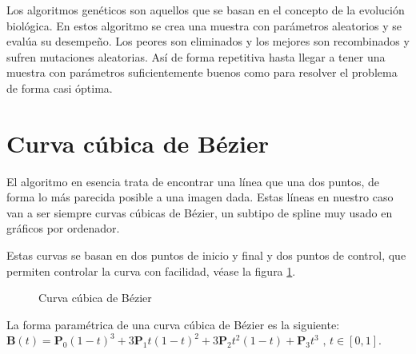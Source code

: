\documentclass{report}
\begin{document}
Los algoritmos genéticos son aquellos que se basan en el concepto de la evolución biológica.
En estos algoritmo se crea una muestra con parámetros aleatorios y se evalúa su desempeño.
Los peores son eliminados y los mejores son recombinados y sufren mutaciones aleatorias. Así de forma repetitiva hasta
llegar a tener una muestra con parámetros suficientemente buenos como para resolver el problema de 
forma casi óptima.

\section{Curva cúbica de Bézier}

El algoritmo en esencia trata de encontrar una línea que una dos puntos, de forma lo más parecida
posible a una imagen dada. Estas líneas en nuestro caso van a ser siempre curvas cúbicas de Bézier,
un subtipo de spline muy usado en gráficos por ordenador.\cite{wiki:bezier}

Estas curvas se basan en dos puntos de inicio y final y dos puntos de control, que permiten controlar
la curva con facilidad, véase la figura \ref{fig:bezier}.

\begin{figure}
	\caption{\label{fig:bezier} Curva cúbica de Bézier}
\end{figure}

La forma paramétrica de una curva cúbica de Bézier es la siguiente:  \\

\begin{math}
	\mathbf{B}(t)=\mathbf{P}_0(1-t)^3+3\mathbf{P}_1t(1-t)^2+3\mathbf{P}_2t^2(1-t)+\mathbf{P}_3t^3 \mbox{ , } t \in [0,1].
\end{math}
\end{document}
